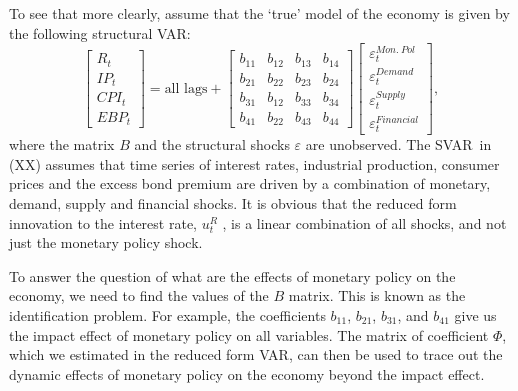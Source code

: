 \documentclass[10pt]{article}
\begin{document}
To see that more clearly, assume that the `true' model of the economy is
given by the following structural VAR:%
\begin{equation}
\begin{bmatrix}
R_{t} \\
IP_{t} \\
CPI_{t} \\
EBP_{t}%
\end{bmatrix}%
=\text{all lags}+\left[
\begin{array}{cccc}
b_{11} & b_{12} & b_{13} & b_{14} \\
b_{21} & b_{22} & b_{23} & b_{24} \\
b_{31} & b_{12} & b_{33} & b_{34} \\
b_{41} & b_{22} & b_{43} & b_{44}%
\end{array}%
\right]
\begin{bmatrix}
\varepsilon _{t}^{Mon.\ Pol} \\
\varepsilon _{t}^{Demand} \\
\varepsilon _{t}^{Supply} \\
\varepsilon _{t}^{Financial}%
\end{bmatrix}%
,  \label{eq:GK_VAR}
\end{equation}%
where the matrix $B$ and the structural shocks $\varepsilon $ are
unobserved. The SVAR\ in (XX) assumes that time series of interest rates,
industrial production, consumer prices and the excess bond premium are
driven by a combination of monetary, demand, supply and financial shocks. It
is obvious that the reduced form innovation to the interest rate, $u_{t}^{R}$%
, is a linear combination of all shocks, and not just the monetary policy
shock.

To answer the question of what are the effects of monetary policy on the
economy, we need to find the values of the $B$ matrix. This is known as the
identification problem. For example, the coefficients $b_{11}$, $b_{21}$, $%
b_{31}$, and $b_{41}$ give us the impact effect of monetary policy on all
variables. The matrix of coefficient $\Phi $, which we estimated in the
reduced form VAR, can then be used to trace out the dynamic effects of
monetary policy on the economy beyond the impact effect.
\end{document}
